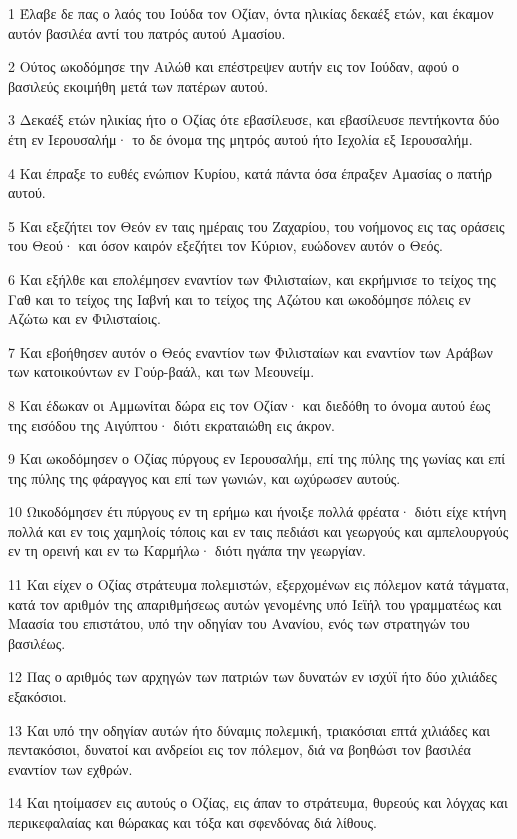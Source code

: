 \par 1 Έλαβε δε πας ο λαός του Ιούδα τον Οζίαν, όντα ηλικίας δεκαέξ ετών, και έκαμον αυτόν βασιλέα αντί του πατρός αυτού Αμασίου.
\par 2 Ούτος ωκοδόμησε την Αιλώθ και επέστρεψεν αυτήν εις τον Ιούδαν, αφού ο βασιλεύς εκοιμήθη μετά των πατέρων αυτού.
\par 3 Δεκαέξ ετών ηλικίας ήτο ο Οζίας ότε εβασίλευσε, και εβασίλευσε πεντήκοντα δύο έτη εν Ιερουσαλήμ· το δε όνομα της μητρός αυτού ήτο Ιεχολία εξ Ιερουσαλήμ.
\par 4 Και έπραξε το ευθές ενώπιον Κυρίου, κατά πάντα όσα έπραξεν Αμασίας ο πατήρ αυτού.
\par 5 Και εξεζήτει τον Θεόν εν ταις ημέραις του Ζαχαρίου, του νοήμονος εις τας οράσεις του Θεού· και όσον καιρόν εξεζήτει τον Κύριον, ευώδονεν αυτόν ο Θεός.
\par 6 Και εξήλθε και επολέμησεν εναντίον των Φιλισταίων, και εκρήμνισε το τείχος της Γαθ και το τείχος της Ιαβνή και το τείχος της Αζώτου και ωκοδόμησε πόλεις εν Αζώτω και εν Φιλισταίοις.
\par 7 Και εβοήθησεν αυτόν ο Θεός εναντίον των Φιλισταίων και εναντίον των Αράβων των κατοικούντων εν Γούρ-βαάλ, και των Μεουνείμ.
\par 8 Και έδωκαν οι Αμμωνίται δώρα εις τον Οζίαν· και διεδόθη το όνομα αυτού έως της εισόδου της Αιγύπτου· διότι εκραταιώθη εις άκρον.
\par 9 Και ωκοδόμησεν ο Οζίας πύργους εν Ιερουσαλήμ, επί της πύλης της γωνίας και επί της πύλης της φάραγγος και επί των γωνιών, και ωχύρωσεν αυτούς.
\par 10 Ωικοδόμησεν έτι πύργους εν τη ερήμω και ήνοιξε πολλά φρέατα· διότι είχε κτήνη πολλά και εν τοις χαμηλοίς τόποις και εν ταις πεδιάσι και γεωργούς και αμπελουργούς εν τη ορεινή και εν τω Καρμήλω· διότι ηγάπα την γεωργίαν.
\par 11 Και είχεν ο Οζίας στράτευμα πολεμιστών, εξερχομένων εις πόλεμον κατά τάγματα, κατά τον αριθμόν της απαριθμήσεως αυτών γενομένης υπό Ιεϊήλ του γραμματέως και Μαασία του επιστάτου, υπό την οδηγίαν του Ανανίου, ενός των στρατηγών του βασιλέως.
\par 12 Πας ο αριθμός των αρχηγών των πατριών των δυνατών εν ισχύϊ ήτο δύο χιλιάδες εξακόσιοι.
\par 13 Και υπό την οδηγίαν αυτών ήτο δύναμις πολεμική, τριακόσιαι επτά χιλιάδες και πεντακόσιοι, δυνατοί και ανδρείοι εις τον πόλεμον, διά να βοηθώσι τον βασιλέα εναντίον των εχθρών.
\par 14 Και ητοίμασεν εις αυτούς ο Οζίας, εις άπαν το στράτευμα, θυρεούς και λόγχας και περικεφαλαίας και θώρακας και τόξα και σφενδόνας διά λίθους.
